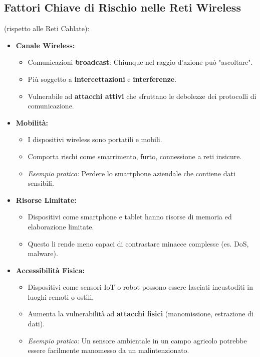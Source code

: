 \documentclass{article}
\begin{document}
\subsection{Fattori Chiave di Rischio nelle Reti Wireless}
(rispetto alle Reti Cablate):
\begin{itemize}
    \item \textbf{Canale Wireless:}
    \begin{itemize}
        \item Comunicazioni \textbf{broadcast}: Chiunque nel raggio d'azione può "ascoltare".
        \item Più soggetto a \textbf{intercettazioni} e \textbf{interferenze}.
        \item Vulnerabile ad \textbf{attacchi attivi} che sfruttano le debolezze dei protocolli di comunicazione.
    \end{itemize}
    \item \textbf{Mobilità:}
    \begin{itemize}
        \item I dispositivi wireless sono portatili e mobili.
        \item Comporta rischi come smarrimento, furto, connessione a reti insicure.
        \item \textit{Esempio pratico:} Perdere lo smartphone aziendale che contiene dati sensibili.
    \end{itemize}
    \item \textbf{Risorse Limitate:}
    \begin{itemize}
        \item Dispositivi come smartphone e tablet hanno risorse di memoria ed elaborazione limitate.
        \item Questo li rende meno capaci di contrastare minacce complesse (es. DoS, malware).
    \end{itemize}
    \item \textbf{Accessibilità Fisica:}
    \begin{itemize}
        \item Dispositivi come sensori IoT o robot possono essere lasciati incustoditi in luoghi remoti o ostili.
        \item Aumenta la vulnerabilità ad \textbf{attacchi fisici} (manomissione, estrazione di dati).
        \item \textit{Esempio pratico:} Un sensore ambientale in un campo agricolo potrebbe essere facilmente manomesso da un malintenzionato.
    \end{itemize}
\end{itemize}
\end{document}
